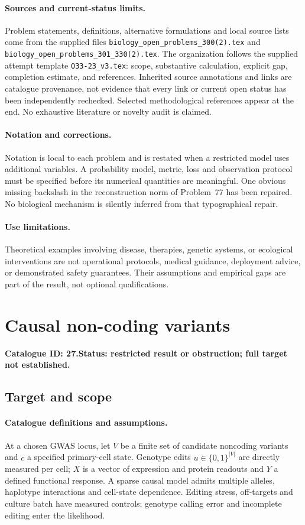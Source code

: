 \documentclass[11pt]{article}
\begin{document}
\paragraph{Sources and current-status limits.}
Problem statements, definitions, alternative formulations and local source lists
come from the supplied files
\texttt{biology\_open\_problems\_300(2).tex} and
\texttt{biology\_open\_problems\_301\_330(2).tex}.
The organization follows the supplied attempt template
\texttt{O33-23\_v3.tex}: scope, substantive calculation, explicit gap,
completion estimate, and references. Inherited source annotations and links are
catalogue provenance, not evidence that every link or current open status has
been independently rechecked. Selected methodological references appear at the
end. No exhaustive literature or novelty audit is claimed.

\paragraph{Notation and corrections.}
Notation is local to each problem and is restated when a restricted model uses
additional variables. A probability model, metric, loss and observation protocol
must be specified before its numerical quantities are meaningful. One obvious
missing backslash in the reconstruction norm of Problem~77 has been repaired.
No biological mechanism is silently inferred from that typographical repair.

\paragraph{Use limitations.}
Theoretical examples involving disease, therapies, genetic systems, or ecological
interventions are not operational protocols, medical guidance, deployment advice,
or demonstrated safety guarantees. Their assumptions and empirical gaps are part
of the result, not optional qualifications.

\setcounter{section}{26}
\section{Causal non-coding variants}
\label{prob:027}
\noindent\textbf{Catalogue ID: 27.}\quad \textbf{Status: restricted result or obstruction; full target not established.}
\subsection{Target and scope}
\paragraph{Catalogue definitions and assumptions.}
At a chosen GWAS locus, let $V$ be a finite set of candidate noncoding variants and $c$ a specified primary-cell state. Genotype edits $u\in\{0,1\}^{|V|}$ are directly measured per cell; $X$ is a vector of expression and protein readouts and $Y$ a defined functional response. A sparse causal model admits multiple alleles, haplotype interactions and cell-state dependence. Editing stress, off-targets and culture batch have measured controls; genotype calling error and incomplete editing enter the likelihood.
\end{document}
